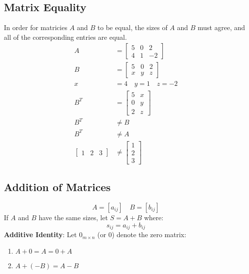 \documentclass[letterpaper, 12pt]{math}
\begin{document}
\subsection*{Matrix Equality}
In order for matricies \( A \) and \( B \) to be equal, the sizes of \( A \) and
\( B \) must agree, and all of the corresponding entries are equal.
\begin{align*}
  A &= \begin{bmatrix}
    5 & 0 & 2 \\
    4 & 1 & -2
  \end{bmatrix} \\
  B &= \begin{bmatrix}
    5 & 0 & 2 \\
    x & y & z
  \end{bmatrix} \\
  x &= 4 \quad y = 1 \quad z = -2 \\
  B^T &= \begin{bmatrix}
    5 & x \\
    0 & y \\
    2 & z
  \end{bmatrix} \\
  B^T &\ne B \\
  B^T &\ne A \\
  \begin{bmatrix}1 & 2 & 3\end{bmatrix} &\ne
    \begin{bmatrix}1 \\ 2 \\ 3\end{bmatrix}
\end{align*}

\subsection*{Addition of Matrices}
\[ A = [a_{ij}] \quad B = [b_{ij}] \]
If \( A \) and \( B \) have the same sizes, let \( S = A+B \) where:
\[ s_{ij} = a_{ij}+b_{ij} \]
\textbf{Additive Identity}: Let \( 0_{m\times n} \) (or 0) denote the zero
matrix:
\begin{enumerate}
  \item \( A+0 = A = 0+A \)
  \item \( A+(-B) = A-B \)
\end{enumerate}
\end{document}
